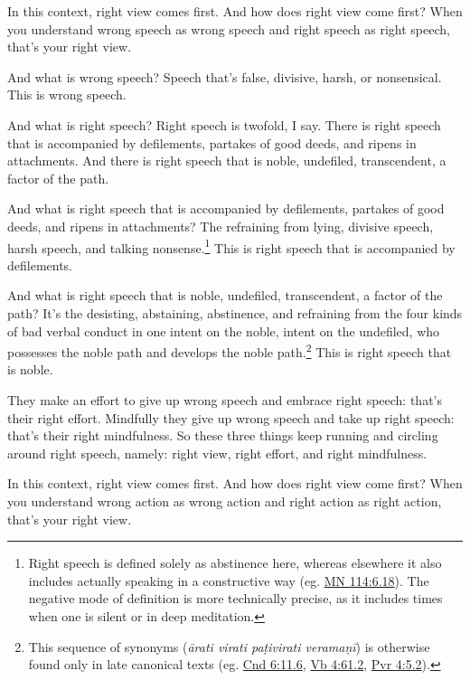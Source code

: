 \documentclass[12pt,openany]{book}%
\begin{document}
In this context, right view comes first. And how does right view come first? When you understand wrong speech as wrong speech and right speech as right speech, that’s your right view. 

And what is wrong speech? Speech that’s false, divisive, harsh, or nonsensical. This is wrong speech. 

And what is right speech? Right speech is twofold, I say. There is right speech that is accompanied by defilements, partakes of good deeds, and ripens in attachments. And there is right speech that is noble, undefiled, transcendent, a factor of the path. 

And what is right speech that is accompanied by defilements, partakes of good deeds, and ripens in attachments? The refraining from lying, divisive speech, harsh speech, and talking nonsense.\footnote{Right speech is defined solely as abstinence here, whereas elsewhere it also includes actually speaking in a constructive way (eg. \href{https://suttacentral.net/mn114/en/sujato\#6.18}{MN 114:6.18}). The negative mode of definition is more technically precise, as it includes times when one is silent or in deep meditation. } This is right speech that is accompanied by defilements. 

And what is right speech that is noble, undefiled, transcendent, a factor of the path? It’s the desisting, abstaining, abstinence, and refraining from the four kinds of bad verbal conduct in one intent on the noble, intent on the undefiled, who possesses the noble path and develops the noble path.\footnote{This sequence of synonyms (\textit{\textsanskrit{ārati} virati \textsanskrit{paṭivirati} \textsanskrit{veramaṇī}}) is otherwise found only in late canonical texts (eg. \href{https://suttacentral.net/cnd6/en/sujato\#11.6}{Cnd 6:11.6}, \href{https://suttacentral.net/vb4/en/sujato\#61.2}{Vb 4:61.2}, \href{https://suttacentral.net/pli-tv-pvr4/en/sujato\#5.2}{Pvr 4:5.2}). } This is right speech that is noble. 

They make an effort to give up wrong speech and embrace right speech: that’s their right effort. Mindfully they give up wrong speech and take up right speech: that’s their right mindfulness. So these three things keep running and circling around right speech, namely: right view, right effort, and right mindfulness. 

In this context, right view comes first. And how does right view come first? When you understand wrong action as wrong action and right action as right action, that’s your right view. 
\end{document}
